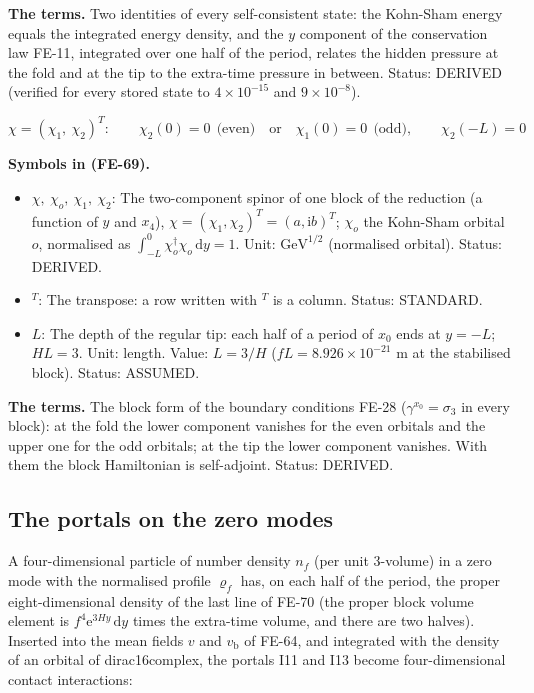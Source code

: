 \documentclass[
  10pt,
]{article}
\providecommand{\tightlist}{%
  \setlength{\itemsep}{0pt}\setlength{\parskip}{0pt}}
\begin{document}
\textbf{The terms.} Two identities of every self-consistent state: the
Kohn-Sham energy equals the integrated energy density, and the \(y\)
component of the conservation law FE-11, integrated over one half of the
period, relates the hidden pressure at the fold and at the tip to the
extra-time pressure in between. Status: DERIVED (verified for every
stored state to \(4\times10^{-15}\) and \(9\times10^{-8}\)).

\[
\chi = (\chi_1,\ \chi_2)^T:\qquad \chi_2(0) = 0\ \ \text{(even)}\quad\text{or}\quad \chi_1(0) =
 0\ \ \text{(odd)},\qquad
\chi_2(-L) = 0 \tag{FE-69}
\]

\textbf{Symbols in (FE-69).}

\begin{itemize}
\tightlist
\item
  \(\chi,\ \chi_o,\ \chi_1,\ \chi_2\): The two-component spinor of one
  block of the reduction (a function of \(y\) and \(x_4\)),
  \(\chi = (\chi_1, \chi_2)^T = (a, \mathrm{i}b)^T\); \(\chi_o\) the
  Kohn-Sham orbital \(o\), normalised as
  \(\int_{-L}^{0}\chi_o^\dagger\chi_o\,\mathrm{d}y = 1\). Unit:
  \(\mathrm{GeV}^{1/2}\) (normalised orbital). Status: DERIVED.
\item
  \({}^T\): The transpose: a row written with \(^T\) is a column.
  Status: STANDARD.
\item
  \(L\): The depth of the regular tip: each half of a period of \(x_0\)
  ends at \(y = -L\); \(HL = 3\). Unit: length. Value: \(L = 3/H\)
  (\(fL = 8.926\times10^{-21}\) m at the stabilised block). Status:
  ASSUMED.
\end{itemize}

\textbf{The terms.} The block form of the boundary conditions FE-28
(\(\gamma^{x_0} = \sigma_3\) in every block): at the fold the lower
component vanishes for the even orbitals and the upper one for the odd
orbitals; at the tip the lower component vanishes. With them the block
Hamiltonian is self-adjoint. Status: DERIVED.

\hypertarget{the-portals-on-the-zero-modes}{%
\subsection{The portals on the zero
modes}\label{the-portals-on-the-zero-modes}}

A four-dimensional particle of number density \(n_f\) (per unit
3-volume) in a zero mode with the normalised profile \(\varrho_f\) has,
on each half of the period, the proper eight-dimensional density of the
last line of FE-70 (the proper block volume element is
\(f^4\mathrm{e}^{3Hy}\,\mathrm{d}y\) times the extra-time volume, and
there are two halves). Inserted into the mean fields \(v\) and
\(v_{\mathrm{b}}\) of FE-64, and integrated with the density of an
orbital of dirac16complex, the portals I11 and I13 become
four-dimensional contact interactions:
\end{document}
